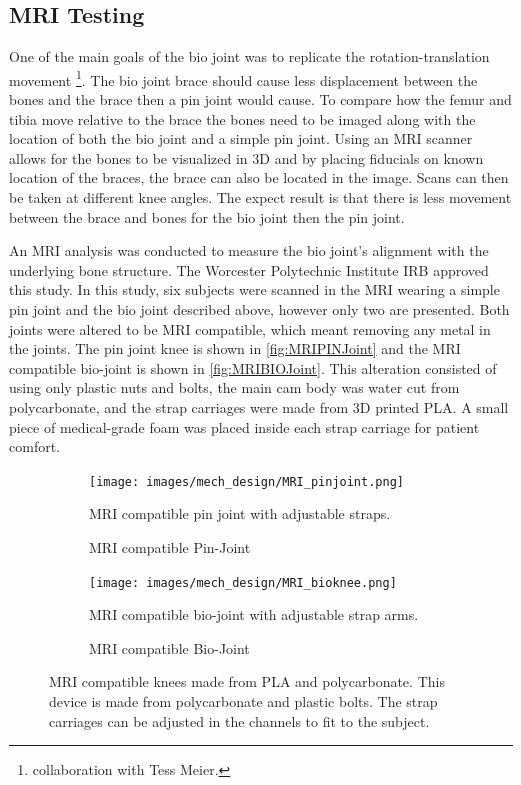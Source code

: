 \subsection{MRI Testing}

One of the main goals of the bio joint was to replicate the rotation-translation movement \footnote{collaboration with Tess Meier.}. The bio joint brace should cause less displacement between the bones and the brace then a pin joint would cause. To compare how the femur and tibia move relative to the brace the bones need to be imaged along with the location of both the bio joint and a simple pin joint. Using an MRI scanner allows for the bones to be visualized in 3D and by placing fiducials on known location of the braces, the brace can also be located in the image. Scans can then be taken at different knee angles. The expect result is that there is less movement between the brace and bones for the bio joint then the pin joint. 

An MRI analysis was conducted to measure the bio joint's alignment with the underlying bone structure. The Worcester Polytechnic Institute IRB approved this study. In this study, six subjects were scanned in the MRI wearing a simple pin joint and the bio joint described above, however only two are presented. Both joints were altered to be MRI compatible, which meant removing any metal in the joints. The pin joint knee is shown in \autoref{fig:MRIPINJoint} and the MRI compatible bio-joint is shown in \autoref{fig:MRIBIOJoint}. This alteration consisted of using only plastic nuts and bolts, the main cam body was water cut from polycarbonate, and the strap carriages were made from 3D printed PLA. A small piece of medical-grade foam was placed inside each strap carriage for patient comfort.    


\begin{figure}
    \begin{subfigure}{\textwidth}
        \centering
        \captionsetup{justification=centering}
        \texttt{[image: images/mech\_design/MRI\_pinjoint.png]}
        \caption{MRI compatible Pin-Joint}{MRI compatible pin joint with adjustable straps.  }
        \label{fig:MRIPINJoint}
    \end{subfigure}
    \begin{subfigure}{\textwidth}
        \centering
        \texttt{[image: images/mech\_design/MRI\_bioknee.png]}
          \captionsetup{justification=centering}
        \caption{MRI compatible Bio-Joint}{MRI compatible bio-joint with adjustable strap arms.}
        \label{fig:MRIBIOJoint}
    \end{subfigure}    

    \caption[MRI Compatible Knees]{MRI compatible knees made from PLA and polycarbonate. This device is made from polycarbonate and plastic bolts. The strap carriages can be adjusted in the channels to fit to the subject.}
    \label{fig:MRIKnees}
\end{figure}



